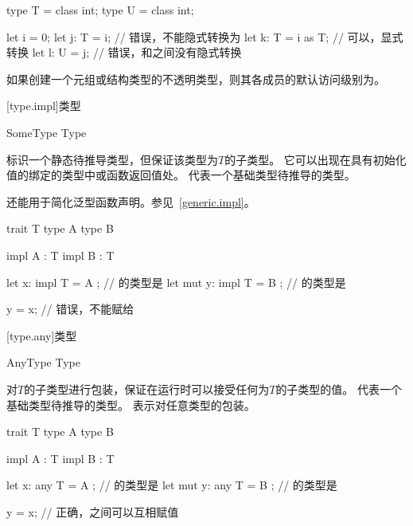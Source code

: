 \enterexample
\begin{codeblock}

type T = class int;
type U = class int;

let i = 0;
let j: T = i; // 错误，不能隐式转换为
let k: T = i as T; // 可以，显式转换
let l: U = j; // 错误，和之间没有隐式转换

\end{codeblock}
\exitexample

\pnum
如果创建一个元组或结构类型的不透明类型，则其各成员的默认访问级别为。

[type.impl]{类型}

\begin{bnf}{SomeType}
     Type \br
     \terminal{_}
\end{bnf}

\pnum
{}标识一个静态待推导类型，但保证该类型为$T$的子类型。
它可以出现在具有初始化值的绑定的类型中或函数返回值处。
代表一个基础类型待推导的类型。

\pnum
{}还能用于简化泛型函数声明。参见~\ref{generic.impl}。

\enterexample
\begin{codeblock}

trait T { }
type A { }
type B { }

impl A : T { }
impl B : T { }

let x: impl T = A { }; // 的类型是
let mut y: impl T = B { }; // 的类型是

y = x; // 错误，不能赋给

\end{codeblock}
\exitexample

[type.any]{类型}

\begin{bnf}{AnyType}
     Type \br
     \terminal{_} \br
\end{bnf}

\pnum
{}对$T$的子类型进行包装，保证在运行时可以接受任何为$T$的子类型的值。
代表一个基础类型待推导的类型。
表示对任意类型的包装。

\enterexample
\begin{codeblock}

trait T { }
type A { }
type B { }

impl A : T { }
impl B : T { }

let x: any T = A { }; // 的类型是
let mut y: any T = B { }; // 的类型是

y = x; // 正确，之间可以互相赋值

\end{codeblock}
\exitexample

